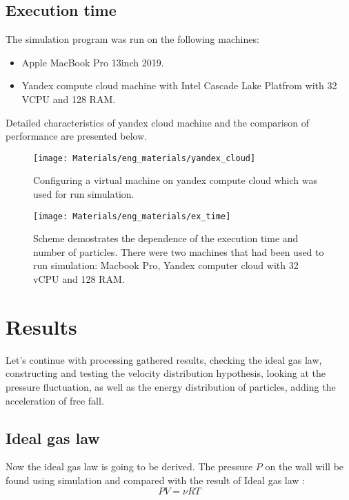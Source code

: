 \documentclass[12pt,twoside]{article}
\begin{document}
    \subsection{Execution time}

  The simulation program was run on the following machines: 
\begin{itemize}
    \item Apple MacBook Pro 13inch 2019.
    \item Yandex compute cloud machine with Intel Cascade Lake Platfrom with 32 VCPU and 128 RAM.
\end{itemize}

Detailed characteristics of yandex cloud machine and the comparison of performance are presented below.

    \begin{figure}[H]
        \centering
        {\texttt{[image: Materials/eng\_materials/yandex\_cloud]}}
        \caption{Configuring a virtual machine on yandex compute cloud which was used for run simulation. 
        } 
    \end{figure}

    \begin{figure}[H]
        \centering
        {\texttt{[image: Materials/eng\_materials/ex\_time]}}
        \caption{Scheme demostrates the dependence of the execution time and number of particles. There were two machines that had been used to run simulation: 
        Macbook Pro, Yandex computer cloud with 32 vCPU and 128 RAM.}
    \end{figure}

    \section{Results}
    Let's continue with processing gathered results, checking the ideal gas law, constructing and testing the velocity distribution hypothesis,
    looking at the pressure fluctuation, as well as the energy distribution of particles, adding the acceleration of free fall.

    \subsection{Ideal gas law}
    \indent Now the ideal gas law is going to be derived. 
    The pressure $P$ on the wall will be found using simulation and compared with the result of Ideal gas law \cite{wiki:idealgas}:
    \begin{equation}
        PV = \nu R T
    \end{equation}
\end{document}
